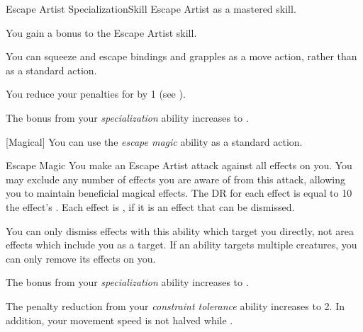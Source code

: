     \begin{feat}{Escape Artist Specialization}{Skill}
        \featpre Escape Artist as a mastered skill.

         You gain a  bonus to the Escape Artist skill.

         You can squeeze and escape bindings and grapples as a move action, rather than as a standard action.

         You reduce your penalties for  by 1 (see ).

         The bonus from your \textit{specialization} ability increases to .

        [Magical] You can use the \textit{escape magic} ability as a standard action.
        \begin{freeability}{Escape Magic}
            You make an Escape Artist attack against all  effects on you.
            You may exclude any number of effects you are aware of from this attack, allowing you to maintain beneficial magical effects.
            The DR for each effect is equal to 10 \add the effect's .
            \hit Each effect is , if it is an effect that can be dismissed.
        \end{freeability}

        You can only dismiss effects with this ability which target you directly, not area effects which include you as a target.
        If an ability targets multiple creatures, you can only remove its effects on you.

         The bonus from your \textit{specialization} ability increases to .

         The penalty reduction from your \textit{constraint tolerance} ability increases to 2.
        In addition, your movement speed is not halved while .
    \end{feat}

